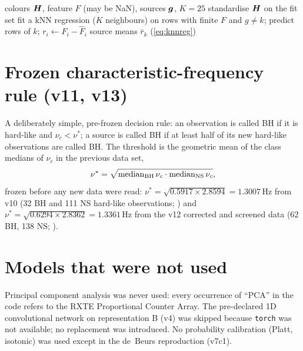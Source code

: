 \begin{algorithm}[htbp]
\caption{Label-free colour residualisation ()}\label{alg:knnreg}
\begin{algorithmic}[1]
\Require colours $\bm{H}$, feature $F$ (may be NaN), sources $\bm{g}$, $K=25$
\State standardise $\bm{H}$ on the fit set
 \State fit a kNN regression ($K$ neighbours) on rows with finite $F$ and $g\ne k$; predict rows of $k$; $r_i\gets F_i-\hat F_i$ \EndFor
\State \Return source means $\bar r_k$ (\cref{eq:knnreg})
\end{algorithmic}
\end{algorithm}

\section{Frozen characteristic-frequency rule (v11, v13)}\label{sec:nurule}
A deliberately simple, pre-frozen decision rule: an observation is called BH if it is hard-like and
$\nu_c<\nu^\ast$; a source is called BH if at least half of its new hard-like observations are called BH. The threshold
is the geometric mean of the class medians of $\nu_c$ in the previous data set,
\begin{equation}
\nu^\ast = \sqrt{\operatorname{median}_{\mathrm{BH}}\nu_c\cdot\operatorname{median}_{\mathrm{NS}}\nu_c},\label{eq:nustar}
\end{equation}
frozen before any new data were read: $\nu^\ast=\sqrt{0.5917\times2.8594}=1.3007$\,Hz from v10 (32 BH and 111 NS
hard-like observations; ) and $\nu^\ast=\sqrt{0.6294\times2.8362}=1.3361$\,Hz from the
v12 corrected and screened data (62 BH, 138 NS; ).

\section{Models that were not used}\label{sec:notused}
Principal component analysis was never used: every occurrence of ``PCA'' in the code refers to the RXTE Proportional
Counter Array. The pre-declared 1D convolutional network on representation B (v4) was skipped because \texttt{torch} was
not available; no replacement was introduced. No probability calibration (Platt, isotonic) was used except in the
de~Beurs reproduction (v7c1).

